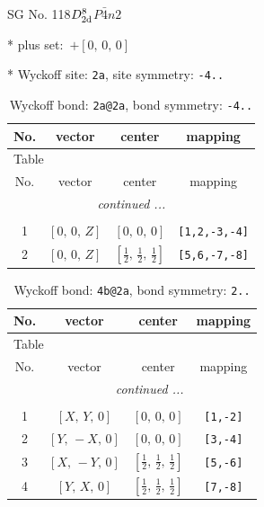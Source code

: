 \documentclass[fleqn,8pt]{jsarticle}
\begin{document}
\setcounter{MaxMatrixCols}{32}

\renewcommand{\tablename}{Table~}
\renewcommand{\figurename}{Figure~}
\begin{center}
\LARGE
SG No. 118\quad$D_{\rm 2d}^{8}$\quad$P\bar{4}n2$\quad[ tetragonal ]
\end{center}

* plus set:\,\,\,$+\left[ 0,\, 0,\, 0 \right]$


* Wyckoff site: {\tt 2a}, site symmetry: {\tt -4..}
\renewcommand{\arraystretch}{1.2}
\begin{longtable}{cccc}
\caption{Wyckoff bond: {\tt 2a@2a}, bond symmetry: {\tt -4..}}
 \\
 \hline \hline
No. & vector & center & mapping \\ \hline \endfirsthead

\multicolumn{3}{l}{\tablename\ \thetable{}} \\
 \hline \hline
No. & vector & center & mapping \\ \hline \endhead

 \hline \hline
\multicolumn{3}{r}{\footnotesize\it continued ...} \\ \endfoot

 \hline \hline
\multicolumn{3}{r}{} \\ \endlastfoot

1 & $\left[ 0,\, 0,\, Z \right]$ & $\left[ 0,\, 0,\, 0 \right]$ & {\tt [1,2,-3,-4]} \\ \hline
2 & $\left[ 0,\, 0,\, Z \right]$ & $\left[ \frac{1}{2},\, \frac{1}{2},\, \frac{1}{2} \right]$ & {\tt [5,6,-7,-8]} \\
\end{longtable}
\renewcommand{\arraystretch}{1.2}
\begin{longtable}{cccc}
\caption{Wyckoff bond: {\tt 4b@2a}, bond symmetry: {\tt 2..}}
 \\
 \hline \hline
No. & vector & center & mapping \\ \hline \endfirsthead

\multicolumn{3}{l}{\tablename\ \thetable{}} \\
 \hline \hline
No. & vector & center & mapping \\ \hline \endhead

 \hline \hline
\multicolumn{3}{r}{\footnotesize\it continued ...} \\ \endfoot

 \hline \hline
\multicolumn{3}{r}{} \\ \endlastfoot

1 & $\left[ X,\, Y,\, 0 \right]$ & $\left[ 0,\, 0,\, 0 \right]$ & {\tt [1,-2]} \\ \hline
2 & $\left[ Y,\, - X,\, 0 \right]$ & $\left[ 0,\, 0,\, 0 \right]$ & {\tt [3,-4]} \\ \hline
3 & $\left[ X,\, - Y,\, 0 \right]$ & $\left[ \frac{1}{2},\, \frac{1}{2},\, \frac{1}{2} \right]$ & {\tt [5,-6]} \\ \hline
4 & $\left[ Y,\, X,\, 0 \right]$ & $\left[ \frac{1}{2},\, \frac{1}{2},\, \frac{1}{2} \right]$ & {\tt [7,-8]} \\
\end{longtable}
\end{document}
